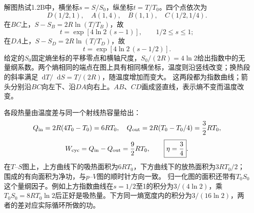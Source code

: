 \documentclass[UTF8,fontset=fandol,a4paper,11pt]{ctexart}
\newcommand{\dd}{\mathop{}\!\mathrm{d}}
\begin{document}
解图热试1.2B中，横坐标$s=S/S_0$，纵坐标$t=T/T_0$。四个点依次为
\[
D(1/2,1),\quad A(1,4),\quad B(1,1),\quad C(1/2,1/4).
\]
在$BC$上，$S-S_B=2R\ln(T/T_B)$，故
\[
t=\exp[4\ln2\,(s-1)],\qquad 1/2\le s\le1;
\]
在$DA$上，$S-S_D=2R\ln(T/T_D)$，故
\[
t=\exp[4\ln2\,(s-1/2)].
\]
给定的$S_0$固定熵坐标的平移零点和横轴尺度，$S_0/(2R)=4\ln2$给出指数中的无量纲系数。两个熵相同的端点在图上具有相同横坐标，温度则沿竖线改变；换热段的斜率满足$\dd T/\dd S=T/(2R)$，随温度增加而变大。
这两段都为指数曲线；箭头分别沿$BC$向左下、沿$DA$向右上。$AB$、$CD$画成竖直线，表示熵不变而温度改变。

各段热量由温度差与同一个射线热容量给出：
\[
Q_{\rm in}=2R(4T_0-T_0)=6RT_0,\quad
Q_{\rm out}=2R(T_0-T_0/4)=\frac32RT_0,
\]
\[
W_{\rm cyc}=Q_{\rm in}-Q_{\rm out}=\frac92RT_0,\qquad
\boxed{\eta=\frac34}.
\]
在$T$--$S$图上，上方曲线下的吸热面积为$6RT_0$，下方曲线下的放热面积为$3RT_0/2$；围成的有向面积为净功，与$p$--$V$图的顺时针方向一致。
归一化图的面积还带有$T_0S_0$这个量纲因子。例如上方指数曲线在$s=1/2$至1的积分为$3/(4\ln2)$，乘$T_0S_0=8RT_0\ln2$后正好是吸热量。下方同一熵宽度内的积分为$3/(16\ln2)$，两者的差对应实际循环所做的功。
\end{document}
